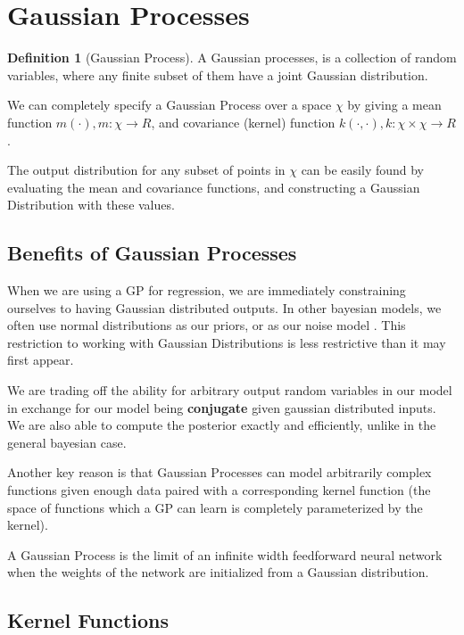 \documentclass[12pt, a4paper]{report}
\theoremstyle{definition}
\theoremstyle{definition}
\newtheorem{definition}{Definition}[section]
\theoremstyle{definition}
\begin{document}
\section{Gaussian Processes}
\label{sec:GaussianProcesses}


\begin{definition}[Gaussian Process]
    A Gaussian processes, is a collection of random variables, where any finite subset of them have a joint Gaussian distribution. \cite{rasmussen2003gaussian}
\end{definition}


We can completely specify a Gaussian Process over a space $\chi$ by giving a mean function $m(\cdot), m : \chi \rightarrow R$, and covariance (kernel) function $k(\cdot, \cdot), k: \chi \times \chi \rightarrow R$.


The output distribution for any subset of points in $\chi$ can be easily found by evaluating the mean and covariance functions, and constructing a Gaussian Distribution with these values.


\subsection{Benefits of Gaussian Processes}

When we are using a GP for regression, we are immediately constraining ourselves to having Gaussian distributed outputs. In other bayesian models, we often use normal distributions as our priors, or as our noise model \cite{}. This restriction to working with Gaussian Distributions is less restrictive than it may first appear.

We are trading off the ability for arbitrary output random variables in our model in exchange for our model being \textbf{conjugate} \cite{} given gaussian distributed inputs. We are also able to compute the posterior exactly and efficiently, unlike in the general bayesian case.

Another key reason is that Gaussian Processes can model arbitrarily complex functions given enough data paired with a corresponding kernel function (the space of functions which a GP can learn is completely parameterized by the kernel).

A Gaussian Process is the limit of an infinite width feedforward neural network when the weights of the network are initialized from a Gaussian distribution. \cite{GPInfinite}

\subsection{Kernel Functions}
\end{document}

